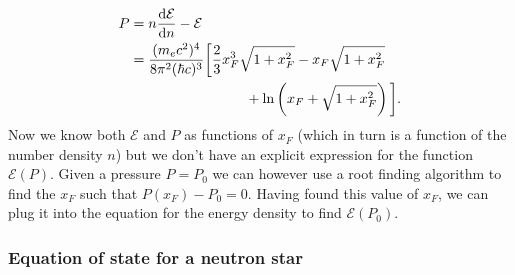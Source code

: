 \documentclass[twocolumn]{article}
\begin{document}
\begin{large}
\begin{equation}
\begin{split}
        P &= n\frac{\text{d}\mathcal{E}}{\text{d}n} - \mathcal{E} \\ 
        &= \frac{(m_ec^2)^4}{8\pi^2(\hbar c)^3}\bigg[\frac{2}{3}x_F^3\sqrt{1+x_F^2}-x_F\sqrt{1+x_F^2} \\ 
        &\hspace{2.90cm}+\ln\left(x_F+\sqrt{1+x_F^2}\right)\bigg].
    \end{split}
\end{equation}
Now we know both $\mathcal{E}$ and $P$ as functions of $x_F$ (which in turn is a function of the number density $n$) but we don't have an explicit expression for the function $\mathcal{E}(P)$. Given a pressure $P=P_0$ we can however use a root finding algorithm to find the $x_F$ such that $P(x_F) - P_0 = 0$. Having found this value of $x_F$, we can plug it into the equation for the energy density to find $\mathcal{E}(P_0)$. 

\subsubsection*{Equation of state for a neutron star}



\end{large}
\end{document}
